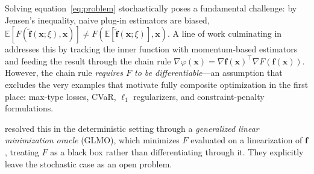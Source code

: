 \documentclass{article}
\def\eqref#1{equation~\ref{#1}}
\def\vf{{\bm{f}}}
\def\vx{{\bm{x}}}
\newcommand{\E}{\mathbb{E}}
\begin{document}
Solving \eqref{eq:problem} stochastically poses a fundamental challenge: by Jensen's inequality, naive plug-in estimators are biased, $\E[F(\tilde\vf(\vx; \xi), \vx)] \ne F(\E[\tilde\vf(\vx; \xi)], \vx)$. A line of work culminating in \citet{chen2020solving, balasubramanian2022stochastic, xiao2022projection} addresses this by tracking the inner function with momentum-based estimators and feeding the result through the chain rule $\nabla \varphi(\vx) = \nabla \vf(\vx)^\top \nabla F(\vf(\vx))$. However, the chain rule \emph{requires $F$ to be differentiable}---an assumption that excludes the very examples that motivate fully composite optimization in the first place: max-type losses, CVaR, $\ell_1$ regularizers, and constraint-penalty formulations.

\citet{vladarean2023first} resolved this in the deterministic setting through a \emph{generalized linear minimization oracle} (GLMO), which minimizes $F$ evaluated on a linearization of $\vf$, treating $F$ as a black box rather than differentiating through it. They explicitly leave the stochastic case as an open problem.
\end{document}
